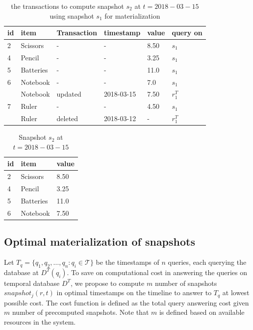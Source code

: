 			\begin{center}
			\begin{table}
				\centering
				\caption{the transactions to compute snapshot $s_2$ at $t = 2018-03-15$ using snapshot $s_1$ for materialization}
				\label{table:transactions_materialized}
				\begin{tabular}{p{1cm}p{2cm}p{2cm}p{3cm}p{2cm}p{2cm}}
					\hline
					id & item & Transaction  &timestamp & value  &query on\\ \hline
					2 & Scissors & - & - & 8.50 & $s_1$ \\ \hline
				  	4 & Pencil & - & - & 3.25 & $s_1$ \\ \hline
			  	  	5 & Batteries & - & - & 11.0 & $s_1$ \\ \hline
					6 & Notebook & - & - & 7.0 & $s_1$ \\ 
					  & Notebook & updated & 2018-03-15 & 7.50 & $r_1^T$ \\ \hline
					7 & Ruler & - & - & 4.50 & $s_1$ \\
					  & Ruler & deleted & 2018-03-12 & - & $r_1^T$ \\ \hline
				\end{tabular}
			\end{table}
			\end{center}

			\begin{center}
			\begin{table}
				\centering
				\caption{Snapshot $s_2$ at $t = 2018-03-15$}
				\label{table:snapshot_s2}
				\begin{tabular}{p{4cm}p{4cm}p{4cm}}
					\hline
					id & item  & value  \\ \hline
					2 & Scissors & 8.50   \\ 
					4 & Pencil & 3.25   \\ 
					5 & Batteries & 11.0   \\ 
					6 & Notebook & 7.50 \\ \hline
				\end{tabular}
			\end{table}
			\end{center}

		\subsection{Optimal materialization of snapshots}
			Let $T_q = \{q_1, q_2, \dots, q_n :q_i \in \mathcal{T}\}$ be the timestamps of $n$ queries, each querying the database at $D^T(q_i)$. To save on computational cost in answering the queries on temporal database $D^T$, we propose to compute $m$ number of snapshots $snapshot_j(r,t)$ in optimal timestamps on the timeline to answer to $T_q$ at lowest possible cost. The cost function is defined as the total query answering cost given $m$ number of precomputed snapshots. Note that $m$ is defined based on available resources in the system.

